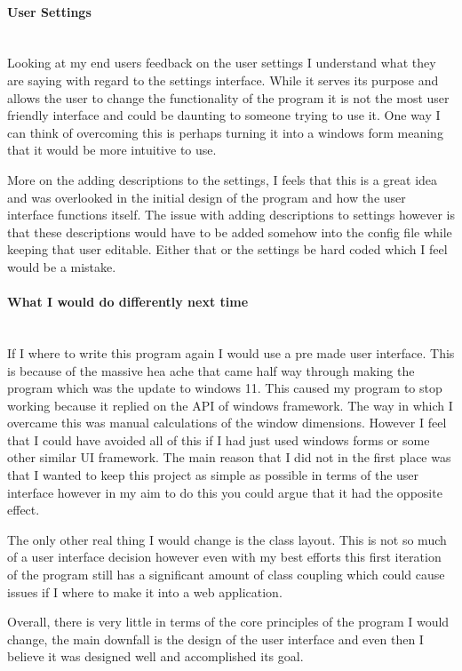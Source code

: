 \begin{FlushLeft}
    \paragraph{User Settings} \mbox{}\\
    Looking at my end users feedback on the user settings I understand what they are saying with regard to the settings interface. While it serves its purpose and allows the user to change the functionality of the program it is not the most user friendly interface and could be daunting to someone trying to use it. One way I can think of overcoming this is perhaps turning it into a windows form meaning that it would be more intuitive to use. \\ \bk

    More on the adding descriptions to the settings, I feels that this is a great idea and was overlooked in the initial design of the program and how the user interface functions itself. The issue with adding descriptions to settings however is that these descriptions would have to be added somehow into the config file while keeping that user editable. Either that or the settings be hard coded which I feel would be a mistake.\\ \bk    
    
    \paragraph{What I would do differently next time} \mbox{} \\
    If I where to write this program again I would use a pre made user interface. This is because of the massive hea ache that came half way through making the program which was the update to windows 11. This caused my program to stop working because it replied on the API of windows framework. The way in which I overcame this was manual calculations of the window dimensions. However I feel that I could have avoided all of this if I had just used windows forms or some other similar UI framework. The main reason that I did not in the first place was that I wanted to keep this project as simple as possible in terms of the user interface however in my aim to do this you could argue that it had the opposite effect. \\ \bk

    The only other real thing I would change is the class layout. This is not so much of a user interface decision however even with my best efforts this first iteration of the program still has a significant amount of class coupling which could cause issues if I where to make it into a web application. \\ \bk

    Overall, there is very little in terms of the core principles of the program I would change, the main downfall is the design of the user interface and even then I believe it was designed well and accomplished its goal.
    
    \BK


\end{FlushLeft}